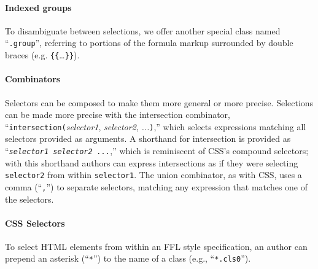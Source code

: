 \paragraph{Indexed groups} To disambiguate between selections, we offer another special class named ``\texttt{.group}'', referring to portions of the formula markup surrounded by double braces (e.g. \texttt{\{\{}\dots\texttt{\}\}}). 


\paragraph{Combinators}
Selectors can be composed to make them more general or more precise. Selections can be made more precise with the intersection combinator, ``\texttt{{intersection}(}{\textit{selector1}, \textit{selector2}, \textit{...}}{\texttt{)}},'' which selects expressions matching all selectors provided as arguments. A shorthand for intersection is provided as ``\texttt{\textit{selector1} \textit{selector2} \textit{...}},'' which is reminiscent of CSS's compound selectors; with this shorthand authors can express intersections as if they were selecting \texttt{selector2} from within \texttt{selector1}. The union combinator, as with CSS, uses a comma (``\texttt{,}'') to separate selectors, matching any expression that matches one of the selectors.


\paragraph{CSS Selectors} To select HTML elements from within an FFL style specification, an author can prepend an asterisk (``\texttt{*}'') to the name of a class (e.g., ``\texttt{*.cls0}'').

